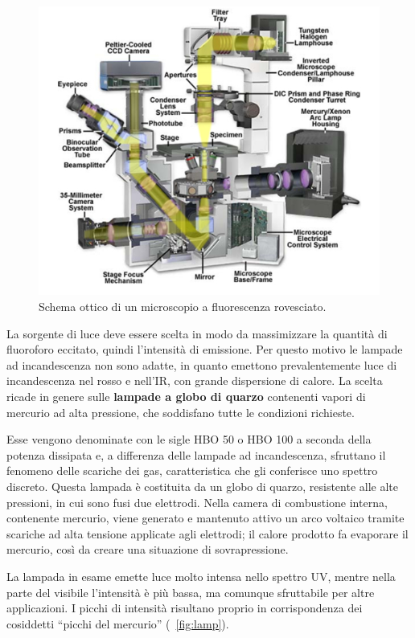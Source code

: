 \begin{figure}
 \centering
 \includegraphics[scale=.60]{img/CAP2microrovesciato.jpg}
 \caption{\small{Schema ottico di un microscopio a fluorescenza rovesciato.}}
 \label{fig:micro}
\end{figure}

La sorgente di luce deve essere scelta in modo da massimizzare la quantità di fluoroforo eccitato, quindi l'intensità di emissione. 
Per questo motivo le lampade ad incandescenza non sono adatte, in quanto emettono prevalentemente luce di incandescenza nel rosso e nell'IR, con grande dispersione di calore. 
La scelta ricade in genere sulle \textbf{lampade a globo di quarzo} contenenti vapori di mercurio ad alta pressione, che soddisfano tutte le condizioni richieste. 

Esse vengono denominate con le sigle HBO 50 o HBO 100 a seconda della potenza dissipata e, a differenza delle lampade ad incandescenza, sfruttano il fenomeno delle scariche dei gas, caratteristica che gli conferisce uno spettro discreto. 
Questa lampada è costituita da un globo di quarzo, resistente alle alte pressioni, in cui sono fusi due elettrodi. 
Nella camera di combustione interna, contenente mercurio, viene generato e mantenuto attivo un arco voltaico tramite scariche ad alta tensione applicate agli elettrodi; il calore prodotto fa evaporare il mercurio, così da creare una situazione di sovrapressione. 

La lampada in esame emette luce molto intensa nello spettro UV, mentre nella parte del visibile l'intensità è più bassa, ma comunque sfruttabile per altre applicazioni. 
I picchi di intensità risultano proprio in corrispondenza dei cosiddetti ``picchi del mercurio'' (\figurename~\ref{fig:lamp}).

